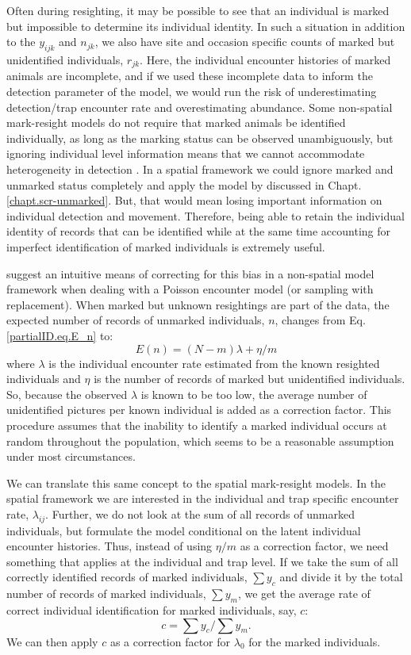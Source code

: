 Often during resighting, it may be possible to see that an individual
is marked but impossible to determine its individual identity. In such
a situation in addition to the $y_{ijk}$ and $n_{jk}$, we also have
site and occasion specific counts of marked but unidentified
individuals, $r_{jk}$. Here, the individual encounter histories of
marked animals are incomplete, and if we used these incomplete data to
inform the detection parameter of the model, we would run the risk of
underestimating detection/trap encounter rate and overestimating
abundance. Some non-spatial mark-resight models do not require that
marked animals be identified individually, as long as the marking
status can be observed unambiguously, but ignoring individual level
information means that we cannot accommodate heterogeneity in
detection \citep{mcclintock_white:2010}. In a spatial framework we
could ignore marked and unmarked status completely and apply the model
by \citet{chandler_royle:2012} discussed in
Chapt. \ref{chapt.scr-unmarked}. But, that would mean losing
important information on individual detection and movement. Therefore,
being able to retain the individual identity of records that can be
identified while at the same time accounting for imperfect identification of marked individuals is extremely useful.

\citet{mcclintock_etal:2009biometrics,mcclintock_etal:2009mdp} suggest
an intuitive means of correcting for this bias in a non-spatial model
framework when dealing with a Poisson encounter model (or sampling
with replacement). When marked but unknown resightings are part of the
data, the expected number of records of unmarked individuals, $n$, changes from Eq. \ref{partialID.eq.E_n} to:
\[
E(n) = (N-m) { \lambda  + \eta/m}
\]
where $\lambda$ is the individual encounter rate estimated from the known resighted individuals and $\eta$ is the number of records of marked but unidentified individuals. So, because the observed $\lambda$ is known to be too low, the average number of unidentified pictures per known individual is added as a correction factor. This procedure assumes that the inability to identify a marked individual occurs at random throughout the population, which seems to be a reasonable assumption under most circumstances.


We can
translate this same concept to the spatial
mark-resight models. In the spatial framework we are interested
in the individual and trap specific encounter rate,
$\lambda_{ij}$. Further, we do not look at the sum of all records of
unmarked individuals, but formulate the model conditional on the
latent individual encounter histories. Thus, instead of using $\eta/m$
as a correction factor, we need something that applies at the
individual and trap level. If we take the sum of all correctly
identified records of marked individuals, $\sum y_c$ and divide it by
the total number of records of marked individuals, $\sum y_m$, we get
the average rate of correct individual identification for marked
individuals, say, $c$:
\[
c = \sum y_c/\sum y_m.
\]
We can then apply $c$ as a correction factor for $\lambda_0$ for the marked individuals.

